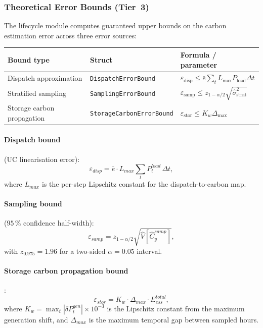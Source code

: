 \subsubsection{Theoretical Error Bounds (Tier~3)}

The lifecycle module computes guaranteed upper bounds on the carbon
estimation error across three error sources:

\begin{center}
\begin{tabular}{lll}
\hline\hline
\textbf{Bound type} & \textbf{Struct} & \textbf{Formula / parameter} \\
\hline
Dispatch approximation & \texttt{DispatchErrorBound} & $\varepsilon_{\text{disp}} \leq \bar{e}\sum_t L_{\max} P_{\text{load}} \Delta t$ \\
Stratified sampling & \texttt{SamplingErrorBound} & $\varepsilon_{\text{samp}} \leq z_{1-\alpha/2}\sqrt{\hat{\sigma}^2_{\text{strat}}}$ \\
Storage carbon propagation & \texttt{StorageCarbonErrorBound} & $\varepsilon_{\text{stor}} \leq K_w \Delta_{\max}$ \\
\hline\hline
\end{tabular}
\end{center}

\paragraph{Dispatch bound} (UC linearisation error):
\begin{equation}
  \varepsilon_{disp} = \bar{e}\cdot L_{max}\sum_t P_t^{load}\,\Delta t,
  \label{eq:bound-disp}
\end{equation}
where $L_{max}$ is the per-step Lipschitz constant for the dispatch-to-carbon
map.

\paragraph{Sampling bound} ($95\,\%$ confidence half-width):
\begin{equation}
  \varepsilon_{samp} = z_{1-\alpha/2}\sqrt{\hat{V}\!\left[\hat{C}_y^{samp}\right]},
  \label{eq:bound-samp}
\end{equation}
with $z_{0.975} = 1.96$ for a two-sided $\alpha = 0.05$ interval.

\paragraph{Storage carbon propagation bound}:
\begin{equation}
  \varepsilon_{stor} = K_w\cdot\Delta_{max}\cdot E_{ess}^{total},
  \label{eq:bound-stor}
\end{equation}
where $K_w = \max_t|\delta P_t^{gen}|\times 10^{-3}$ is the Lipschitz
constant from the maximum generation shift, and $\Delta_{max}$ is the
maximum temporal gap between sampled hours.

